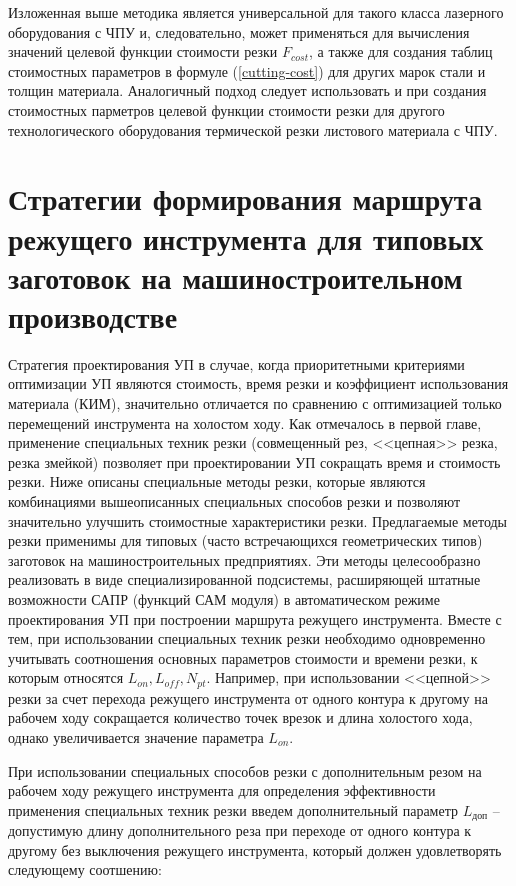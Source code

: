 \documentclass[11pt,twoside,openany]{report}
\begin{document}
Изложенная выше методика является универсальной
для такого класса лазерного оборудования с ЧПУ и,
следовательно, может применяться для вычисления значений
целевой функции стоимости резки
$F_{cost}$,
а также для создания таблиц стоимостных параметров в формуле (\ref{cutting-cost})
для других марок стали и толщин материала.
Аналогичный подход следует использовать и при создания
стоимостных парметров целевой функции стоимости резки
для другого технологического оборудования термической
резки листового материала с ЧПУ.

\section{
  Стратегии формирования маршрута режущего инструмента
  для типовых заготовок на машиностроительном производстве
}

Стратегия проектирования УП в случае,
когда приоритетными критериями оптимизации УП являются стоимость,
время резки и коэффициент использования материала (КИМ),
значительно отличается по сравнению с оптимизацией
только перемещений инструмента на холостом ходу.
Как отмечалось в первой главе,
применение специальных техник резки
(совмещенный рез, <<цепная>> резка, резка змейкой)
позволяет при проектировании УП сокращать время и стоимость резки.
Ниже описаны специальные методы резки,
которые являются комбинациями вышеописанных специальных способов резки
и позволяют значительно улучшить стоимостные характеристики резки.
Предлагаемые методы резки применимы для типовых
(часто встречающихся геометрических типов)
заготовок на машиностроительных предприятиях.
Эти методы целесообразно реализовать в
виде специализированной подсистемы,
расширяющей штатные возможности САПР (функций САМ модуля)
в автоматическом режиме проектирования УП при построении
маршрута режущего инструмента.
Вместе с тем, при использовании специальных техник
резки необходимо одновременно учитывать соотношения
основных параметров стоимости и времени резки,
к которым относятся
$L_{on}, L_{off}, N_{pt}$.
Например, при использовании <<цепной>> резки
за счет перехода режущего инструмента от одного
контура к другому на рабочем ходу сокращается
количество точек врезок и длина холостого хода,
однако увеличивается значение параметра
$L_{on}$.

При использовании специальных способов резки
с дополнительным резом на рабочем ходу режущего инструмента
для определения эффективности применения специальных
техник резки введем дополнительный параметр
$L_\text{доп}$ -- допустимую длину дополнительного реза
при переходе от одного контура к другому
без выключения режущего инструмента,
который должен удовлетворять следующему соотшению:
\end{document}
